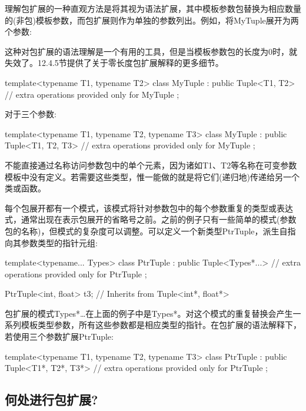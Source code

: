 理解包扩展的一种直观方法是将其视为语法扩展，其中模板参数包替换为相应数量的(非包)模板参数，而包扩展则作为单独的参数列出。例如，将MyTuple展开为两个参数:

\begin{notice}
这种对包扩展的语法理解是一个有用的工具，但是当模板参数包的长度为0时，就失效了。12.4.5节提供了关于零长度包扩展解释的更多细节。
\end{notice}

\begin{cpp}
template<typename T1, typename T2>
class MyTuple : public Tuple<T1, T2> {
	// extra operations provided only for MyTuple
};
\end{cpp}

对于三个参数:

\begin{cpp}
template<typename T1, typename T2, typename T3>
class MyTuple : public Tuple<T1, T2, T3> {
	// extra operations provided only for MyTuple
};
\end{cpp}

不能直接通过名称访问参数包中的单个元素，因为诸如T1、T2等名称在可变参数模板中没有定义。若需要这些类型，惟一能做的就是将它们(递归地)传递给另一个类或函数。

每个包展开都有一个模式，该模式将针对参数包中的每个参数重复的类型或表达式，通常出现在表示包展开的省略号之前。之前的例子只有一些简单的模式(参数包的名称)，但模式的复杂度可以调整。可以定义一个新类型PtrTuple，派生自指向其参数类型的指针元组:

\begin{cpp}
template<typename... Types>
class PtrTuple : public Tuple<Types*...> {
	// extra operations provided only for PtrTuple
};

PtrTuple<int, float> t3; // Inherits from Tuple<int*, float*>
\end{cpp}

包扩展的模式Types*…在上面的例子中是Types*。对这个模式的重复替换会产生一系列模板类型参数，所有这些参数都是相应类型的指针。在包扩展的语法解释下，若使用三个参数扩展PtrTuple:

\begin{cpp}
template<typename T1, typename T2, typename T3>
class PtrTuple : public Tuple<T1*, T2*, T3*> {
	// extra operations provided only for PtrTuple
};
\end{cpp}

\subsection{何处进行包扩展?}

